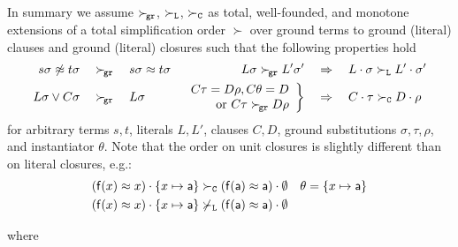\begin{remark}
    In summary we assume \( \mathrel\succ_{\!\mathtt{gr}} \), \( \mathrel\succ_{\mathtt{L}} \), \( \mathrel\succ_{\mathtt{C}} \) as
        total, well-founded, and monotone extensions of a
        total simplification order \( \succ \)
        over ground terms to ground (literal) clauses
        and ground (literal) closures
        such that the following properties hold
       \begin{align*}
            s\sigma\not\approx t\sigma \quad&\mathrel\succ_{\!\mathtt{gr}}\quad s\sigma\approx t\sigma
           &
           L\sigma \mathrel\succ_{\!\mathtt{gr}} L'\sigma'
           \quad&\Rightarrow\quad
            L\cdot\sigma \mathrel\succ_{\mathtt{L}} L'\cdot\sigma'
           \\
            L\sigma\lor C\sigma \quad&\mathrel\succ_{\!\mathtt{gr}}\quad L\sigma
       &
       \left.
       \begin{array}{r}
        C\tau=D\rho, C\theta=D
        \\
        \text{or } C\tau\mathrel\succ_{\!\mathtt{gr}} D\rho
    \end{array}
       \right \}
           \quad&\Rightarrow\quad
            C\cdot\tau\mathrel\succ_{\mathtt{C}}{} D\cdot\rho{}
       \end{align*}
        for arbitrary terms \( s,t \),
        literals \( L, L' \),
        clauses \( C,D \),
        ground substitutions \( \sigma, \tau, \rho \),
        and instantiator \( \theta \).
        Note that the order on unit closures is slightly different than on literal closures, e.g.:
       \begin{align*}
            (\mathsf{f}(x)\approx x)\cdot \{ x\mapsto \mathsf{a} \}
            &\mathrel\succ_{\mathtt{C}}
            (\mathsf{f}(\mathsf{a})\approx\mathsf{a})\cdot\emptyset
            & \theta = \{ x\mapsto \mathsf{a} \}
       \\
        (\mathsf{f}(x)\approx x)\cdot \{ x\mapsto \mathsf{a} \}
        &\not\mathrel\succ_{\mathtt{L}}
        (\mathsf{f}(\mathsf{a})\approx\mathsf{a})\cdot\emptyset
       \end{align*}
\end{remark}

\begin{definition}\label{def:unit:paramodulation}
   
    where
   
   \end{definition}

